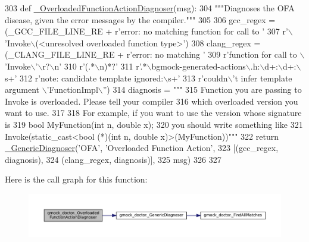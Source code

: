 \begin{DoxyCode}
303 \textcolor{keyword}{def }\hyperlink{namespacegmock__doctor_a385cf8cf2ca6731bf66d721e2dbf89d1}{\_OverloadedFunctionActionDiagnoser}(msg):
304   \textcolor{stringliteral}{"""Diagnoses the OFA disease, given the error messages by the compiler."""}
305 
306   gcc\_regex = (\_GCC\_FILE\_LINE\_RE + \textcolor{stringliteral}{r'error: no matching function for call to '}
307                \textcolor{stringliteral}{r'\(\backslash\)'Invoke\(\backslash\)(<unresolved overloaded function type>'})
308   clang\_regex = (\_CLANG\_FILE\_LINE\_RE + \textcolor{stringliteral}{r'error: no matching '}
309                  \textcolor{stringliteral}{r'function for call to \(\backslash\)'Invoke\(\backslash\)'\(\backslash\)r?\(\backslash\)n'}
310                  \textcolor{stringliteral}{r'(.*\(\backslash\)n)*?'}
311                  \textcolor{stringliteral}{r'.*\(\backslash\)bgmock-generated-actions\(\backslash\).h:\(\backslash\)d+:\(\backslash\)d+:\(\backslash\)s+'}
312                  \textcolor{stringliteral}{r'note: candidate template ignored:\(\backslash\)s+'}
313                  \textcolor{stringliteral}{r'couldn\(\backslash\)'t infer template argument \(\backslash\)'FunctionImpl\(\backslash\)''})
314   diagnosis = \textcolor{stringliteral}{"""}
315 \textcolor{stringliteral}{Function you are passing to Invoke is overloaded.  Please tell your compiler}
316 \textcolor{stringliteral}{which overloaded version you want to use.}
317 \textcolor{stringliteral}{}
318 \textcolor{stringliteral}{For example, if you want to use the version whose signature is}
319 \textcolor{stringliteral}{  bool MyFunction(int n, double x);}
320 \textcolor{stringliteral}{you should write something like}
321 \textcolor{stringliteral}{  Invoke(static\_cast<bool (*)(int n, double x)>(MyFunction))"""}
322   \textcolor{keywordflow}{return} \hyperlink{namespacegmock__doctor_af5023d3e12d1f4a7171c6b035783de84}{\_GenericDiagnoser}(\textcolor{stringliteral}{'OFA'}, \textcolor{stringliteral}{'Overloaded Function Action'},
323                            [(gcc\_regex, diagnosis),
324                             (clang\_regex, diagnosis)],
325                            msg)
326 
327 
\end{DoxyCode}
Here is the call graph for this function\+:
\nopagebreak
\begin{figure}[H]
\begin{center}
\leavevmode
\includegraphics[width=350pt]{namespacegmock__doctor_a385cf8cf2ca6731bf66d721e2dbf89d1_cgraph}
\end{center}
\end{figure}
\mbox{\label{namespacegmock__doctor_a82934d9b43f75ab1112a9436c1a31068}} 
